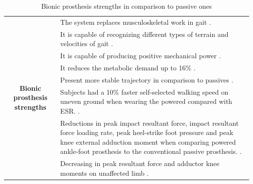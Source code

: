 \documentclass[12pt,english]{article}
\providecommand{\tabularnewline}{\\}
\begin{document}
\begin{center}
\begin{table}[H]
\caption{\label{tab:Fortalezas-de-las-activas}Bionic prosthesis strengths in comparison to passive ones}


\begin{tabular}{|c|>{\centering}p{15cm}|}
\hline 
\multirow{8}{*}[-6mm]{\begin{turn}{90}
\textbf{Bionic prosthesis strengths}
\end{turn}} & The system replaces musculoskeletal work in gait \cite{Varol2010}. \tabularnewline
\cline{2-2} 
 & It is capable of recognizing different types of terrain and velocities of gait \cite{Lawson2011}. \tabularnewline
\cline{2-2} 
 & It is capable of producing positive mechanical power \cite{Martinez-Villalpando2009}.\tabularnewline
\cline{2-2} 
 & It reduces the metabolic demand up to 16\% \cite{Herr2010,Esposito2015}.\tabularnewline
\cline{2-2} 
 & Present more stable trajectory in comparison to passives \cite{Hill2013a}.\tabularnewline
\cline{2-2} 
 & Subjects had a 10\% faster self-selected walking speed on uneven ground when wearing the powered compared with ESR. \cite{Gates2013}.\tabularnewline
\cline{2-2} 
 & Reductions in peak impact resultant force, impact resultant force loading rate, peak heel-strike foot pressure and peak knee external adduction moment when comparing powered ankle-foot prosthesis to the conventional passive prosthesis. \cite{Hill2013a}.\tabularnewline
\cline{2-2} 
 & Decreasing in peak resultant force and adductor knee moments on unaffected limb \cite{Grabowski2013}.\tabularnewline
\hline 
\end{tabular}
\end{table}

\par\end{center}
\end{document}
